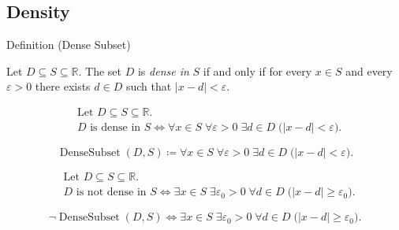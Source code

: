 
\subsection*{Density}




\begin{definitionbox}{Definition (Dense Subset)}
\begin{definition}
\label{def:dense-subset}
Let $D\subseteq S\subseteq\mathbb{R}$. The set $D$ is \emph{dense in} $S$ if and only if for every $x\in S$ and every $\varepsilon>0$ there exists $d\in D$ such that $|x-d|<\varepsilon$.
\end{definition}
\end{definitionbox}

\begin{remark*}
\[
\begin{aligned}
&\text{Let }D\subseteq S\subseteq\mathbb{R}.\\
&D\text{ is dense in }S
\Longleftrightarrow
\forall x\in S\;\forall \varepsilon>0\;\exists d\in D\;\bigl(|x-d|<\varepsilon\bigr).
\end{aligned}
\]
\end{remark*}

\begin{remark*}
\[
\operatorname{DenseSubset}(D,S)\coloneqq
\forall x\in S\;\forall \varepsilon>0\;\exists d\in D\;\bigl(|x-d|<\varepsilon\bigr).
\]
\end{remark*}

\begin{remark*}
\[
\begin{aligned}
&\text{Let }D\subseteq S\subseteq\mathbb{R}.\\
&D\text{ is not dense in }S
\Longleftrightarrow
\exists x\in S\;\exists \varepsilon_0>0\;\forall d\in D\;\bigl(|x-d|\ge \varepsilon_0\bigr).
\end{aligned}
\]
\end{remark*}

\begin{remark*}
\[
\neg\operatorname{DenseSubset}(D,S)\Longleftrightarrow
\exists x\in S\;\exists \varepsilon_0>0\;\forall d\in D\;\bigl(|x-d|\ge \varepsilon_0\bigr).
\]
\end{remark*}

